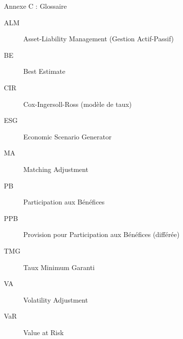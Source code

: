 \documentclass[10pt,aspectratio=169]{beamer}
\begin{document}
\begin{frame}{Annexe C : Glossaire}
\begin{description}
    \item[ALM] Asset-Liability Management (Gestion Actif-Passif)
    \item[BE] Best Estimate
    \item[CIR] Cox-Ingersoll-Ross (modèle de taux)
    \item[ESG] Economic Scenario Generator
    \item[MA] Matching Adjustment
    \item[PB] Participation aux Bénéfices
    \item[PPB] Provision pour Participation aux Bénéfices (différée)
    \item[TMG] Taux Minimum Garanti
    \item[VA] Volatility Adjustment
    \item[VaR] Value at Risk
\end{description}
\end{frame}
\end{document}
